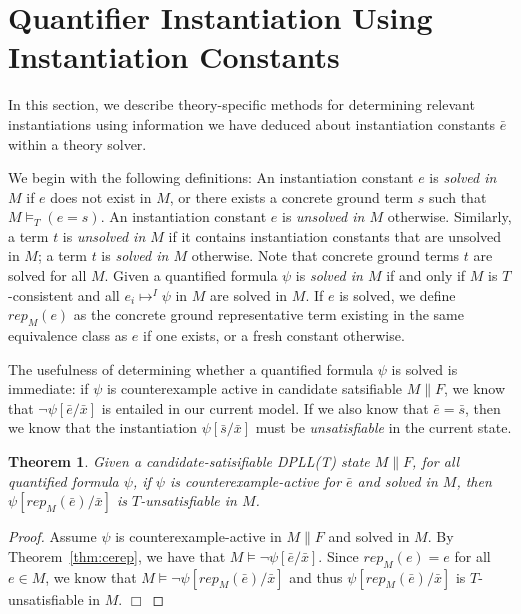 \documentclass{llncs}
\newtheorem{thm}{Theorem}
\begin{document}
\section{Quantifier Instantiation Using Instantiation Constants}

In this section, we describe theory-specific methods for determining relevant instantiations using information we have deduced about instantiation constants $\bar{e}$ within a theory solver.

We begin with the following definitions:
An instantiation constant $e$ is \emph{solved in $M$} if $e$ does not exist in $M$, or there exists a concrete ground term $s$ such that $M \models_T (e = s)$.
An instantiation constant $e$ is \emph{unsolved in $M$} otherwise.
Similarly, a term $t$ is \emph{unsolved in $M$} if it contains instantiation constants that are unsolved in $M$; a term $t$ is \emph{solved in $M$} otherwise.
Note that concrete ground terms $t$ are solved for all $M$.
Given a quantified formula $\psi$ is \emph{solved in $M$} if and only if $M$ is $T$-consistent and all $e_i \mapsto^I \psi$ in $M$ are solved in $M$.
If $e$ is solved, we define $rep_M( e )$ as the concrete ground representative term existing in the same equivalence class as $e$ if one exists, or a fresh constant otherwise.

The usefulness of determining whether a quantified formula $\psi$ is solved is immediate:  if $\psi$ is counterexample active in candidate satsifiable $M \parallel F$, we know that $\neg \psi[ \bar{e}/\bar{x} ]$ is entailed in our current model.
If we also know that $\bar{e} = \bar{s}$, then we know that the instantiation $\psi[ \bar{s}/\bar{x} ]$ must be \emph{unsatisfiable} in the current state.

\begin{thm}
\label{thm:instready}
Given a candidate-satisifiable DPLL(T) state $M \parallel F$, for all quantified formula $\psi$, if $\psi$ is counterexample-active for $\bar{e}$ and solved in $M$, then $\psi[rep_M( \bar{e} )/\bar{x}]$ is $T$-unsatisfiable in $M$.
\end{thm}
\begin{proof}
Assume $\psi$ is counterexample-active in $M \parallel F$ and solved in $M$.
By Theorem~\ref{thm:cerep}, we have that $M \models \neg \psi[\bar{e}/\bar{x}]$.
Since $rep_M( e ) = e$ for all $e \in M$, we know that $M \models \neg \psi[rep_M( \bar{e} )/\bar{x}]$ and thus $\psi[rep_M( \bar{e} )/\bar{x}]$ is $T$-unsatisfiable in $M$. $\Box$
\end{proof}
\end{document}
